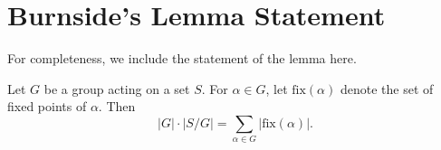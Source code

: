 \documentclass[11pt]{scrartcl}
\begin{document}
\section{Burnside's Lemma Statement}

For completeness, we include the statement of the lemma here.

\begin{theorem*}
  Let $G$ be a group acting on a set $S$. For $\alpha \in G$, let $\text{fix}(\alpha)$ denote the set of fixed points of $\alpha$. Then\[\lvert G \rvert \cdot \lvert S/G \rvert = \sum_{\alpha \in G} \lvert \text{fix}(\alpha) \rvert .\]
\end{theorem*}
\end{document}
